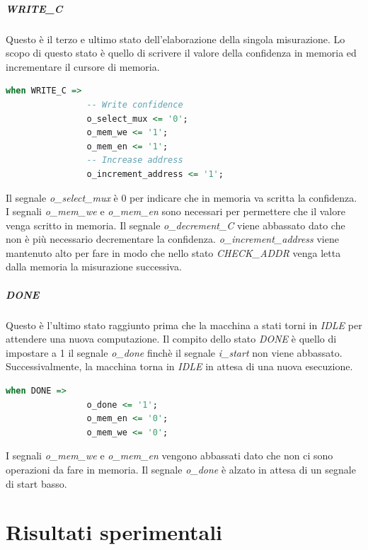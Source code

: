 \documentclass[12pt,a4paper]{scrartcl}
\begin{document}
                 \subparagraph{WRITE\_C} Questo è il terzo e ultimo stato dell'elaborazione della singola misurazione.
                    \newline Lo scopo di questo stato è quello di scrivere il valore della confidenza in memoria ed incrementare il cursore di memoria.
                 \begin{lstlisting}[language=VHDL]
            when WRITE_C =>
                -- Write confidence
                o_select_mux <= '0';
                o_mem_we <= '1';
                o_mem_en <= '1';
                -- Increase address
                o_increment_address <= '1';
                 \end{lstlisting} 
                 Il segnale \textit{o\_select\_mux} è 0 per indicare che in memoria va scritta la confidenza. I segnali \textit{o\_mem\_we} e \textit{o\_mem\_en} sono necessari per permettere che il valore venga scritto in memoria.
                 \newline Il segnale \textit{o\_decrement\_C} viene abbassato dato che non è più necessario decrementare la confidenza.
                 \newline \textit{o\_increment\_address} viene mantenuto alto per fare in modo che nello stato \textit{CHECK\_ADDR} venga letta dalla memoria la misurazione successiva.
                 
                 \subparagraph{DONE} Questo è l'ultimo stato raggiunto prima che la macchina a stati torni in \textit{IDLE} per attendere una nuova computazione.
                 \newline Il compito dello stato \textit{DONE} è quello di impostare a 1 il segnale \textit{o\_done} finchè il segnale \textit{i\_start} non viene abbassato. Successivalmente, la macchina torna in \textit{IDLE} in attesa di una nuova esecuzione.
                 \begin{lstlisting}[language=VHDL]
            when DONE =>
                o_done <= '1';
                o_mem_en <= '0';
                o_mem_we <= '0';
                 \end{lstlisting} 
                 I segnali \textit{o\_mem\_we} e \textit{o\_mem\_en} vengono abbassati dato che non ci sono operazioni da fare in memoria.
                 \newline Il segnale \textit{o\_done} è alzato in attesa di un segnale di start basso.
\section{Risultati sperimentali}
\end{document}
